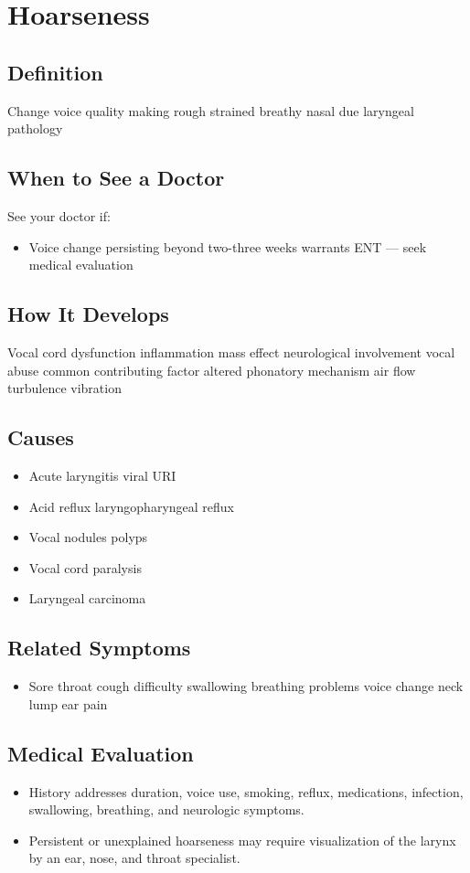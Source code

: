 \chapter{Hoarseness}

\section*{Definition}
Change voice quality making rough strained breathy nasal due laryngeal pathology

\section*{When to See a Doctor}
See your doctor if:
\begin{itemize}
  \item Voice change persisting beyond two-three weeks warrants ENT — seek medical evaluation
\end{itemize}

\section*{How It Develops}
Vocal cord dysfunction inflammation mass effect neurological involvement vocal abuse common contributing factor altered phonatory mechanism air flow turbulence vibration

\section*{Causes}
\begin{itemize}
  \item Acute laryngitis viral URI
  \item Acid reflux laryngopharyngeal reflux
  \item Vocal nodules polyps
  \item Vocal cord paralysis
  \item Laryngeal carcinoma
\end{itemize}

\section*{Related Symptoms}
\begin{itemize}
  \item Sore throat cough difficulty swallowing breathing problems voice change neck lump ear pain
\end{itemize}

\section*{Medical Evaluation}
\begin{itemize}
  \item History addresses duration, voice use, smoking, reflux, medications, infection, swallowing, breathing, and neurologic symptoms.
  \item Persistent or unexplained hoarseness may require visualization of the larynx by an ear, nose, and throat specialist.
\end{itemize}

